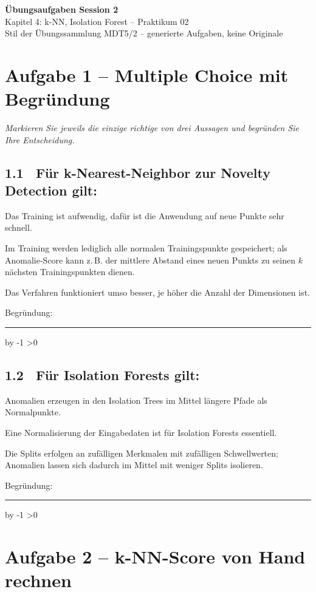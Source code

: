\documentclass[10pt,a4paper]{article}
\newcommand{\mcbox}{\raisebox{-1pt}{\fbox{\rule{0pt}{7pt}\rule{7pt}{0pt}}}\hspace{6pt}}
\newcommand{\antwortlinien}[1]{%
  \par\vspace{2pt}%
  \newcount\zeilen \zeilen=#1
  \loop
    \noindent\rule{\linewidth}{0.4pt}\par\vspace{11pt}%
    \advance\zeilen by -1
  \ifnum\zeilen>0 \repeat
}
\begin{document}
\begin{center}
  {\Large\bfseries Übungsaufgaben Session 2}\\[4pt]
  {\large Kapitel 4: k-NN, Isolation Forest -- Praktikum 02}\\[4pt]
  \small Stil der Übungssammlung MDT5/2 -- generierte Aufgaben, keine Originale
\end{center}

\vspace{4pt}

\section*{Aufgabe 1 -- Multiple Choice mit Begründung}
\emph{Markieren Sie jeweils die einzige richtige von drei Aussagen und begründen Sie Ihre Entscheidung.}

\subsection*{1.1 \ Für k-Nearest-Neighbor zur Novelty Detection gilt:}
\mcbox Das Training ist aufwendig, dafür ist die Anwendung auf neue Punkte sehr schnell.

\mcbox Im Training werden lediglich alle normalen Trainingspunkte gespeichert; als Anomalie-Score
kann z.\,B. der mittlere Abstand eines neuen Punkts zu seinen $k$ nächsten Trainingspunkten dienen.

\mcbox Das Verfahren funktioniert umso besser, je höher die Anzahl der Dimensionen ist.

Begründung:
\antwortlinien{2}

\subsection*{1.2 \ Für Isolation Forests gilt:}
\mcbox Anomalien erzeugen in den Isolation Trees im Mittel längere Pfade als Normalpunkte.

\mcbox Eine Normalisierung der Eingabedaten ist für Isolation Forests essentiell.

\mcbox Die Splits erfolgen an zufälligen Merkmalen mit zufälligen Schwellwerten; Anomalien
lassen sich dadurch im Mittel mit weniger Splits isolieren.

Begründung:
\antwortlinien{2}

\section*{Aufgabe 2 -- k-NN-Score von Hand rechnen}
\end{document}
